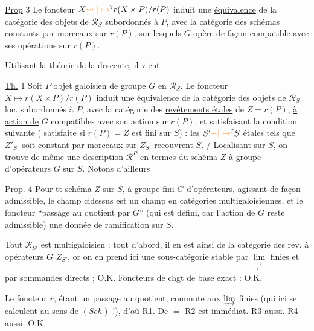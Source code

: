 \uline{Prop} 3 
Le foncteur $X\unsure{\leadsto|\mapsto}r(X\times P)/r(P)$ induit une \uline{équivalence} de la catégorie des objets de $\mathscr R_S$ subordonnés à $P$, avec la catégorie des schémas  constants par morceaux sur $r(P)$, sur lesquels $G$ opère de façon compatible avec ses opérations sur $r(P)$.

Utilisant la théorie de la descente, il vient

\uline{Th.} 1 Soit $P$ objet galoisien de groupe $G$ en $\mathscr R_S$. Le foncteur $X\longmapsto r(X\times P)/r(P)$ induit une équivalence de la catégorie des objets de $\mathscr R_S$ loc. subordonnés à $P$, avec la catégorie des \uline{revêtements étales}  de $Z=r(P)$, \uline{à action de} $G$ compatibles avec son action sur $r(P)$, et satisfaisant la condition suivante ( satisfaite si $r(P)=Z$ est fini sur $S$) : les $S'\unsure{-|\to}S$ étales tels que $Z'_{S'}$ soit  constant par morceaux sur $Z_{S'}$ \uline{recouvrent} $S$. / Localisant sur $S$, on trouve de même une description  $\mathscr R^P$ en termes du schéma $Z$ à groupe d'opérateurs $G$ sur $S$.
Notons d'ailleurs

\uline{Prop. 4} Pour tt schéma  $Z$ sur \uline{$S$}, à groupe fini $G$ d'opérateurs,  agissant de façon admissible, le champ   cidessus est un champ en catégories multigaloisiennes, et le foncteur ``passage au quotient par $G$'' (qui est défini, car l'action de $G$ reste admissible)   une donnée de ramification sur $S$.

Tout $\mathscr R_{S'}$ est multigaloisien : tout d'abord, il en est ainsi de la catégorie des  rev. à opérateurs $G$  $Z_{S'}$, or on en prend ici une sous-catégorie stable par $\mathop{\mathrm{lim}}\limits_{\substack{\longrightarrow\\\longleftarrow}}$ finies et par sommandes directs ; O.K. Foncteurs de chgt de base exact : O.K.

Le foncteur $r$, étant un passage au quotient, commute aux $\varinjlim$ finies (qui ici se calculent au sens de $(Sch)$ !), d'où R1. De $=$ R2 est immédiat. R3 aussi. R4 aussi. O.K.


